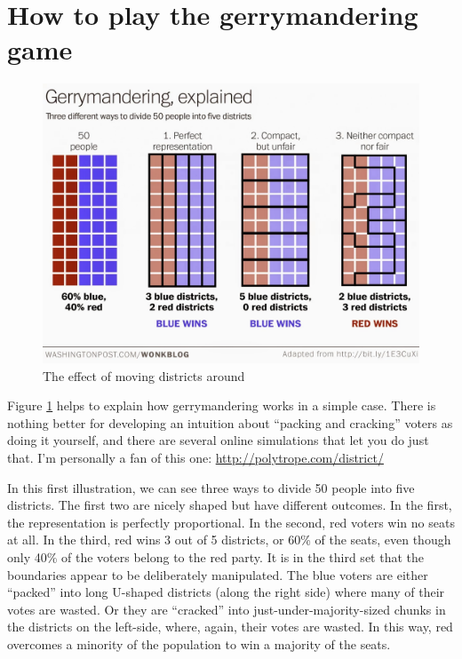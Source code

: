 \documentclass[
  openany]{book}
\begin{document}
\hypertarget{how-to-play-the-gerrymandering-game}{%
\section*{How to play the gerrymandering game}\label{how-to-play-the-gerrymandering-game}}

\begin{figure}

{\centering \includegraphics[width=0.9\linewidth]{images/gerrymandering_simple} 

}

\caption{The effect of moving districts around}\label{fig:gerrymandering-simple}
\end{figure}

Figure \ref{fig:gerrymandering-simple} helps to explain how gerrymandering works in a simple case. There is nothing better for developing an intuition about ``packing and cracking'' voters as doing it yourself, and there are several online simulations that let you do just that. I'm personally a fan of this one: \url{http://polytrope.com/district/}

In this first illustration, we can see three ways to divide 50 people into five districts. The first two are nicely shaped but have different outcomes. In the first, the representation is perfectly proportional. In the second, red voters win no seats at all. In the third, red wins 3 out of 5 districts, or 60\% of the seats, even though only 40\% of the voters belong to the red party. It is in the third set that the boundaries appear to be deliberately manipulated. The blue voters are either ``packed'' into long U-shaped districts (along the right side) where many of their votes are wasted. Or they are ``cracked'' into just-under-majority-sized chunks in the districts on the left-side, where, again, their votes are wasted. In this way, red overcomes a minority of the population to win a majority of the seats.
\end{document}
